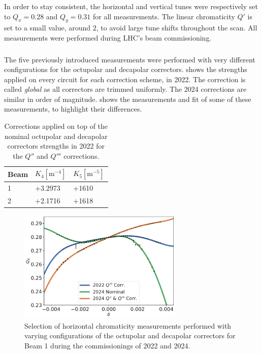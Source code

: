 In order to stay consistent, the horizontal and vertical tunes were respectively set to $Q_x = 0.28$
and $Q_y = 0.31$ for all measurements. The linear chromaticity $Q'$ is set to a small value, around
$2$, to avoid large tune shifts throughout the scan.
All measurements were performed during LHC's beam commissioning.



\subsubsection{}

The five previously introduced measurements were performed with very different configurations for
the octupolar and decapolar correctors.  shows the strengths
applied on every circuit for each correction scheme, in 2022. The correction is called 
\textit{global} as all correctors are trimmed uniformly. The 2024 corrections are similar in order
of magnitude.
 shows the measurements and fit of some of these
measurements, to highlight their differences.

\begin{table}[H]
  \centering
  \begin{tabular}{lll}
  \toprule
    Beam  &    $K_4 [\mathrm{m}^{-4}]$      &  $K_5 [\mathrm{m}^{-5}]$  \\
  \midrule
      1   &   +3.2973    &  +1610   \\
      2   &   +2.1716    &  +1618   \\
  \bottomrule
  \end{tabular}
  \caption{Corrections applied on top of the nominal octupolar and decapolar correctors strengths in
  2022 for the $Q''$ and $Q'''$ corrections.}
  \label{tab:high_orders:mcdo_values_corr}
\end{table}

\begin{figure}[H]
  \centering
  \includegraphics[width=0.7\textwidth]{./images/chromaticity_2024_vs_2022/chroma_comparison_B1_X.pdf}
  \caption{Selection of horizontal chromaticity measurements performed with varying configurations
  of the octupolar and decapolar correctors for Beam 1 during the commissionings of 2022 and 2024.}
  \label{fig:high_orders:comparison_2022_2024}
\end{figure}

